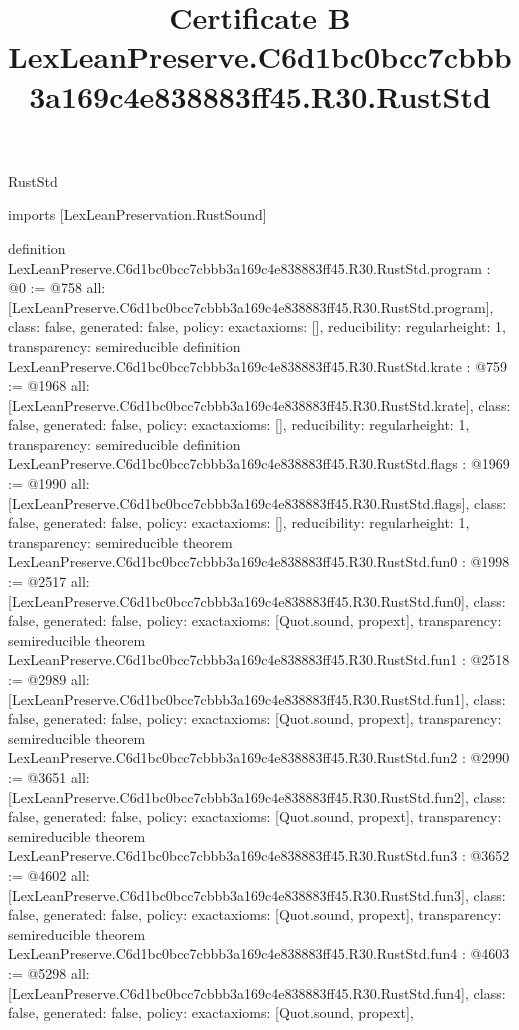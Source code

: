 \begin{lexlean}{RustStd}
\title{Certificate B LexLeanPreserve.C6d1bc0bcc7cbbb3a169c4e838883ff45.R30.RustStd}
\begin{coremodule}
imports [LexLeanPreservation.RustSound]

definition LexLeanPreserve.C6d1bc0bcc7cbbb3a169c4e838883ff45.R30.RustStd.program : @0 := @758 {
  all: [LexLeanPreserve.C6d1bc0bcc7cbbb3a169c4e838883ff45.R30.RustStd.program],
  class: false,
  generated: false,
  policy: exact{axioms: []},
  reducibility: regular{height: 1},
  transparency: semireducible
}
definition LexLeanPreserve.C6d1bc0bcc7cbbb3a169c4e838883ff45.R30.RustStd.krate : @759 := @1968 {
  all: [LexLeanPreserve.C6d1bc0bcc7cbbb3a169c4e838883ff45.R30.RustStd.krate],
  class: false,
  generated: false,
  policy: exact{axioms: []},
  reducibility: regular{height: 1},
  transparency: semireducible
}
definition LexLeanPreserve.C6d1bc0bcc7cbbb3a169c4e838883ff45.R30.RustStd.flags : @1969 := @1990 {
  all: [LexLeanPreserve.C6d1bc0bcc7cbbb3a169c4e838883ff45.R30.RustStd.flags],
  class: false,
  generated: false,
  policy: exact{axioms: []},
  reducibility: regular{height: 1},
  transparency: semireducible
}
theorem LexLeanPreserve.C6d1bc0bcc7cbbb3a169c4e838883ff45.R30.RustStd.fun0 : @1998 := @2517 {
  all: [LexLeanPreserve.C6d1bc0bcc7cbbb3a169c4e838883ff45.R30.RustStd.fun0],
  class: false,
  generated: false,
  policy: exact{axioms: [Quot.sound, propext]},
  transparency: semireducible
}
theorem LexLeanPreserve.C6d1bc0bcc7cbbb3a169c4e838883ff45.R30.RustStd.fun1 : @2518 := @2989 {
  all: [LexLeanPreserve.C6d1bc0bcc7cbbb3a169c4e838883ff45.R30.RustStd.fun1],
  class: false,
  generated: false,
  policy: exact{axioms: [Quot.sound, propext]},
  transparency: semireducible
}
theorem LexLeanPreserve.C6d1bc0bcc7cbbb3a169c4e838883ff45.R30.RustStd.fun2 : @2990 := @3651 {
  all: [LexLeanPreserve.C6d1bc0bcc7cbbb3a169c4e838883ff45.R30.RustStd.fun2],
  class: false,
  generated: false,
  policy: exact{axioms: [Quot.sound, propext]},
  transparency: semireducible
}
theorem LexLeanPreserve.C6d1bc0bcc7cbbb3a169c4e838883ff45.R30.RustStd.fun3 : @3652 := @4602 {
  all: [LexLeanPreserve.C6d1bc0bcc7cbbb3a169c4e838883ff45.R30.RustStd.fun3],
  class: false,
  generated: false,
  policy: exact{axioms: [Quot.sound, propext]},
  transparency: semireducible
}
theorem LexLeanPreserve.C6d1bc0bcc7cbbb3a169c4e838883ff45.R30.RustStd.fun4 : @4603 := @5298 {
  all: [LexLeanPreserve.C6d1bc0bcc7cbbb3a169c4e838883ff45.R30.RustStd.fun4],
  class: false,
  generated: false,
  policy: exact{axioms: [Quot.sound, propext]},
}
\end{coremodule}
\end{lexlean}
